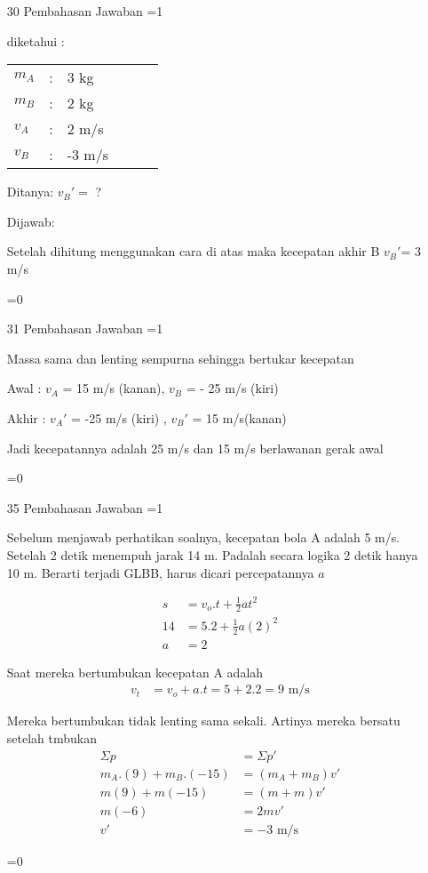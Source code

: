 \documentclass[10pt,a4paper]{article}
\def\tampilkunci{1}
\newcommand{\hide}[1]{\ifnum\tampilkunci=1
%
\begin{mybox}
 #1
\end{mybox}
%
\vspace{\baselineskip}\fi\ifnum\tampilkunci=0
%
%
\fi}
\begin{document}
\begin{multicols*}{2}
\begin{enumerate}
\item[30] Pembahasan Jawaban
\hide{
diketahui :

\begin{tabular}{p{0.5cm} p{1mm} p{2cm} p{1cm} p{0.5cm} p{2cm} }
$m_A$ &: & 3 kg  & & &\\
$m_B$ &: & 2 kg  & & &\\
$v_A$ &: & 2 m/s  & & &\\
$v_B$ &: & -3 m/s  & & &\\
\end{tabular}

Ditanya: $v_B'=$ ?

Dijawab:

Setelah dihitung menggunakan cara di atas maka kecepatan akhir B  $v_B'$= 3 m/s

}

\item[31] Pembahasan Jawaban
\hide{
Massa sama dan lenting sempurna sehingga bertukar kecepatan

Awal : $v_A$ = 15 m/s (kanan), $v_B$ = - 25 m/s (kiri)

Akhir : $v_A'$ = -25 m/s (kiri) , $v_B'$ = 15 m/s(kanan)

Jadi kecepatannya adalah 25 m/s dan 15 m/s berlawanan gerak awal


}

\item[35] Pembahasan Jawaban
\hide{
Sebelum menjawab perhatikan soalnya, kecepatan bola A adalah 5 m/s. Setelah 2 detik menempuh jarak 14 m. Padalah secara logika 2 detik hanya 10 m. Berarti terjadi GLBB, harus dicari percepatannya $a$

\begin{align*}
s &=v_o.t + \frac{1}{2}at^2\\
14 &=5.2 + \frac{1}{2}a(2)^2\\
a &= 2
\end{align*}

Saat mereka bertumbukan kecepatan A adalah
\begin{align*}
v_t &= v_o + a.t = 5 + 2.2 = 9 \text{ m/s}
\end{align*}

Mereka bertumbukan tidak lenting sama sekali. Artinya mereka bersatu setelah tmbukan
\begin{align*}
\Sigma p &= \Sigma p'\\
m_A.(9) + m_B.(-15) &= (m_A+ m_B)v'\\
m(9) + m(-15) &= (m+m)v'\\
m(-6) &= 2m v'\\
v'&= -3 \text{ m/s}
\end{align*}
}







\end{enumerate}
\end{multicols*} 
\end{document}

